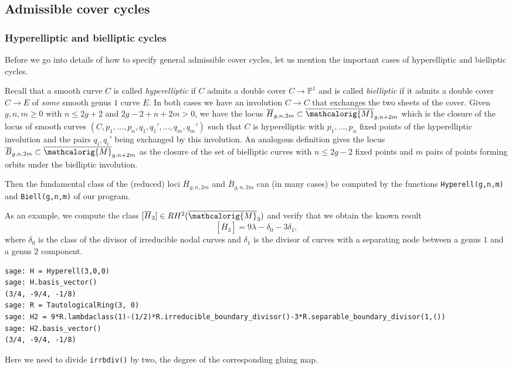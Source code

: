 \documentclass[11pt]{article}
\newcommand{\M}{\ensuremath{\overline{\mathcalorig{M}}}}
\begin{document}
\subsection{Admissible cover cycles} \label{Sect:admccycles}
\subsubsection{Hyperelliptic and bielliptic cycles}
Before we go into details of how to specify general admissible cover cycles, let us mention the important cases of hyperelliptic and bielliptic cycles.

Recall that a smooth curve $C$ is called \emph{hyperelliptic} if $C$ admits a double cover $C \to \mathbb{P}^1$ and is called \emph{bielliptic} if it admits a double cover $C \to E$ of \emph{some} smooth genus $1$ curve $E$. In both cases we have an involution $C \to C$ that exchanges the two sheets of the cover.
Given $g,n,m \geq 0$ with $n \leq 2g+2$ and  $2g-2+n+2m >0$, we have the locus $\overline{H}_{g,n,2m} \subset \M_{g,n+2m}$ which is the closure of the locus of smooth curves $(C,p_1, \ldots, p_n, q_1, q_1', \ldots, q_{m}, q_{m}')$ such that $C$ is hyperelliptic with $p_1, \ldots, p_n$ fixed points of the hyperelliptic involution and the pairs $q_i, q_i'$ being exchanged by this involution. An analogous definition gives the locus $\overline{B}_{g,n,2m} \subset \M_{g,n+2m}$ as the closure of the set of bielliptic curves with $n \leq 2g-2$ fixed points and $m$ pairs of points forming orbits under the bielliptic involution.

Then the fundamental class of the (reduced) loci $\overline{H}_{g,n,2m}$ and $\overline{B}_{g,n,2m}$ can (in many cases) be computed by the functions \verb|Hyperell(g,n,m)| and \verb|Biell(g,n,m)| of our program.

As an example, we compute the class $[\overline{H}_{3}] \in RH^2(\M_3)$ and verify that we obtain the known result \[[\overline{H}_{3}]=9\lambda - \delta_0 - 3\delta_1,\]
where $\delta_0$ is the class of the divisor of irreducible nodal curves and $\delta_1$ is the divisor of curves with a separating node between a genus $1$ and a genus $2$ component.
\begin{lstlisting}
sage: H = Hyperell(3,0,0)
sage: H.basis_vector()
(3/4, -9/4, -1/8)
sage: R = TautologicalRing(3, 0)
sage: H2 = 9*R.lambdaclass(1)-(1/2)*R.irreducible_boundary_divisor()-3*R.separable_boundary_divisor(1,())
sage: H2.basis_vector()
(3/4, -9/4, -1/8)
\end{lstlisting}
Here we need to divide \verb|irrbdiv()| by two, the degree of the corresponding gluing map.
\end{document}
